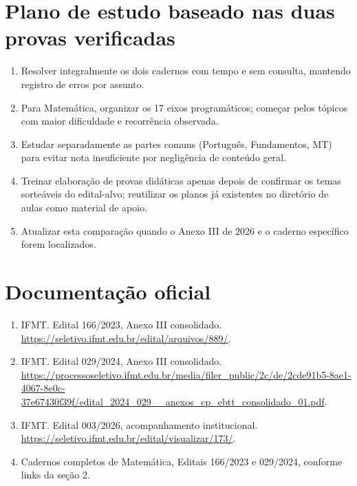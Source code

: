 \documentclass[11pt,a4paper]{article}
\begin{document}
\section{Plano de estudo baseado nas duas provas verificadas}
\begin{enumerate}
\item Resolver integralmente os dois cadernos com tempo e sem consulta, mantendo registro de erros por assunto.
\item Para Matemática, organizar os 17 eixos programáticos; começar pelos tópicos com maior dificuldade e recorrência observada.
\item Estudar separadamente as partes comuns (Português, Fundamentos, MT) para evitar nota insuficiente por negligência de conteúdo geral.
\item Treinar elaboração de provas didáticas apenas depois de confirmar os temas sorteáveis do edital-alvo; reutilizar os planos já existentes no diretório de aulas como material de apoio.
\item Atualizar esta comparação quando o Anexo III de 2026 e o caderno específico forem localizados.
\end{enumerate}

\section*{Documentação oficial}
\begin{enumerate}
\item IFMT. Edital 166/2023, Anexo III consolidado. \url{https://seletivo.ifmt.edu.br/edital/arquivos/889/}.
\item IFMT. Edital 029/2024, Anexo III consolidado. \url{https://processoseletivo.ifmt.edu.br/media/filer_public/2c/de/2cde91b5-8ae1-4067-8e0c-37e67430f39f/edital_2024_029__anexos_cp_ebtt_consolidado_01.pdf}.
\item IFMT. Edital 003/2026, acompanhamento institucional. \url{https://seletivo.ifmt.edu.br/edital/visualizar/173/}.
\item Cadernos completos de Matemática, Editais 166/2023 e 029/2024, conforme links da seção 2.
\end{enumerate}
\end{document}
